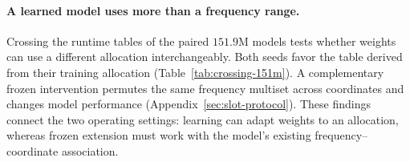 \paragraph{A learned model uses more than a frequency range.}
Crossing the runtime tables of the paired $151.9$M models tests whether weights
can use a different allocation interchangeably. Both seeds favor the table
derived from their training allocation (Table~\ref{tab:crossing-151m}).
A complementary frozen intervention permutes
the same frequency multiset across coordinates and changes model performance
(Appendix~\ref{sec:slot-protocol}). These findings connect the two operating
settings: learning can adapt weights to an allocation, whereas frozen extension
must work with the model's existing frequency--coordinate association.
